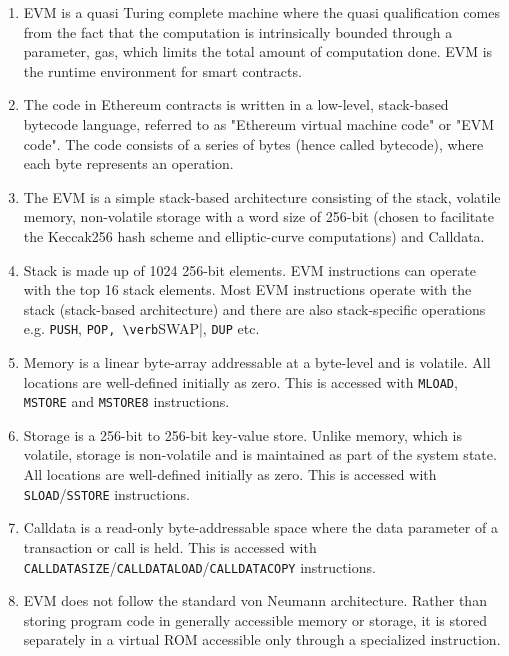 \begin{enumerate}
\item EVM is a quasi Turing complete machine where the quasi qualification comes from the fact that the computation is intrinsically bounded through a parameter, gas, which limits the total amount of computation done. EVM is the runtime environment for smart contracts.

\item The code in Ethereum contracts is written in a low-level, stack-based bytecode language, referred to as "Ethereum virtual machine code" or "EVM code". The code consists of a series of bytes (hence called bytecode), where each byte represents an operation.

\item The EVM is a simple stack-based architecture consisting of the stack, volatile memory, non-volatile storage with a word size of 256-bit (chosen to facilitate the Keccak256 hash scheme and elliptic-curve computations) and Calldata.

\item Stack is made up of 1024 256-bit elements. EVM instructions can operate with the top 16 stack elements. Most EVM instructions operate with the stack (stack-based architecture) and there are also stack-specific operations e.g. \verb|PUSH|, \verb|POP, \verb|SWAP|, \verb|DUP| etc.

\item Memory is a linear byte-array addressable at a byte-level and is volatile. All locations are well-defined initially as zero. This is accessed with \verb|MLOAD|, \verb|MSTORE| and \verb|MSTORE8| instructions.

\item Storage is a 256-bit to 256-bit key-value store. Unlike memory, which is volatile, storage is non-volatile and is maintained as part of the system state. All locations are well-defined initially as zero. This is accessed with \verb|SLOAD|/\verb|SSTORE| instructions.

\item Calldata is a read-only byte-addressable space where the data parameter of a transaction or call is held. This is accessed with \verb|CALLDATASIZE|/\linebreak\verb|CALLDATALOAD|/\verb|CALLDATACOPY| instructions.

\item EVM does not follow the standard von Neumann architecture. Rather than storing program code in generally accessible memory or storage, it is stored separately in a virtual ROM accessible only through a specialized instruction.


\end{enumerate}
